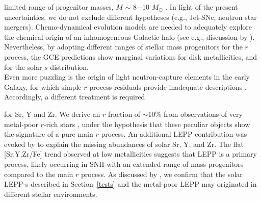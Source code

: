 \documentclass[manuscript]{aastex}
\begin{document}
limited range of progenitor masses, $M$ $\sim$ 8$-$10 $M_\odot$ \citep{travaglio99}.
In light of the present uncertainties,
we do not exclude different hypotheses (e.g., Jet-SNe, neutron star mergers).
Chemo-dynamical evolution models are needed to adequately explore the chemical 
origin of an inhomogeneous Galactic halo (see e.g., discussion by  
\citealt{shen15,vandevoort15,kobayashi11}). 
Nevertheless, by adopting different ranges of stellar mass progenitors for the $r$ process, 
the GCE predictions show marginal variations for disk metallicities, and for the solar 
$s$ distribution.
\\
Even more puzzling is the origin of light neutron-capture elements in the 
early Galaxy, for which simple $r$-process residuals provide inadequate 
descriptions \citep{travaglio04}. 
Accordingly, a different treatment is required 

for Sr, Y and Zr. We derive an $r$ fraction of $\sim$10\% from observations of 
very metal-poor $r$-rich stars \citep{mashonkina14,roederer14}, under the hypothesis that 
these peculiar objects show the signature of a pure main $r$-process. 
An additional LEPP contribution was evoked by \citet{travaglio04} to explain the 
missing abundances of solar Sr, Y, and Zr. The flat [Sr,Y,Zr/Fe] trend observed
at low metallicities suggests that LEPP is a primary process, likely occurring in 
SNII with an extended range of mass progenitors compared to the main $r$ process.
As discussed by \citet{travaglio04}, we confirm that the solar LEPP-s described 
in Section~\ref{tests} and the metal-poor LEPP may originated in different 
stellar environments.
\end{document}
